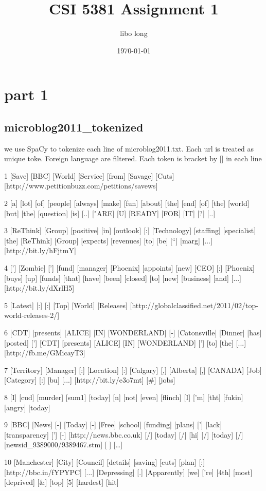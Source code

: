 \documentclass{article}
\title{CSI 5381 Assignment 1}
\author{libo long}
\date{\today}
\begin{document}
\maketitle

\section{part 1}
\subsection{microblog2011\_tokenized}
we use SpaCy to tokenize each line of microblog2011.txt. Each url is treated as unique toke. Foreign language are filtered. Each token is bracket by [] in each line

\begin{spverbatim}
1 [Save] [BBC] [World] [Service] [from] [Savage] [Cuts] 
[http://www.petitionbuzz.com/petitions/savews] 

2 [a] [lot] [of] [people] [always] [make] [fun] [about] [the] [end] [of] [the] [world] [but] [the] [question] [is] [..] ["ARE] [U] [READY] [FOR] [IT] [?] [..] 

3 [ReThink] [Group] [positive] [in] [outlook] [:] [Technology] [staffing] [specialist] [the] [ReThink] [Group] [expects] [revenues] [to] [be] [“] [marg] [...] [http://bit.ly/hFjtmY] 

4 ['] [Zombie] ['] [fund] [manager] [Phoenix] [appoints] [new] [CEO] [:] [Phoenix] [buys] [up] [funds] [that] [have] [been] [closed] [to] [new] [business] [and] [...] [http://bit.ly/dXrlH5] 

5 [Latest] [:] [:] [Top] [World] [Releases] 
[http://globalclassified.net/2011/02/top-world-releases-2/] 

6 [CDT] [presents] [ALICE] [IN] [WONDERLAND] [-] [Catonsville] [Dinner] [has] [posted] ['] [CDT] [presents] [ALICE] [IN] [WONDERLAND] ['] [to] [the] [...] [http://fb.me/GMicayT3] 

7 [Territory] [Manager] [:] [Location] [:] [Calgary] [,] [Alberta] [,] [CANADA] [Job] [Category] [:] [bu] [...] [http://bit.ly/e3o7mt] [#] [jobs] 

8 [I] [cud] [murder] [sum1] [today] [n] [not] [even] [flinch] [I] ['m] [tht] [fukin] [angry] [today] 

9 [BBC] [News] [-] [Today] [-] [Free] [school] [funding] [plans] ['] [lack] [transparency] ['] [-] [http://news.bbc.co.uk] [/] [today] [/] [hi] [/] [today] [/] [newsid_9389000/9389467.stm] [ ] […] 

10 [Manchester] [City] [Council] [details] [saving] [cuts] [plan] [:] [http://bbc.in/fYPYPC] [...] [Depressing] [.] [Apparently] [we] [’re] [4th] [most] [deprived] [&] [top] [5] [hardest] [hit] 


\end{spverbatim}
\end{document}
